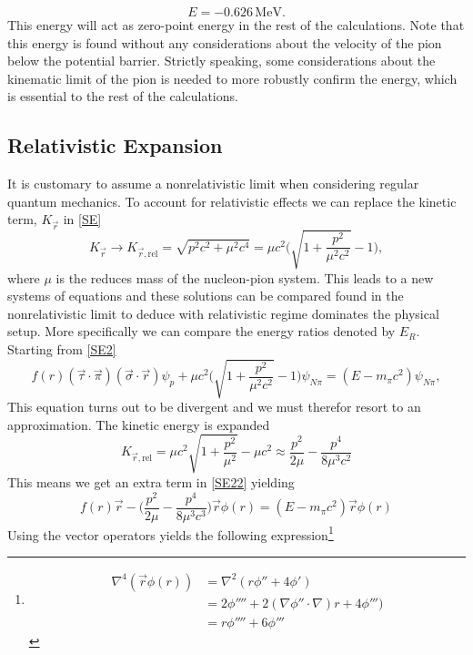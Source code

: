 \begin{equation}
E = -0.626 \, \text{MeV}.
\end{equation}
This energy will act as zero-point energy in the rest of the calculations. Note that this energy is found without any considerations about the velocity of the pion below the potential barrier. Strictly speaking, some considerations about the kinematic limit of the pion is needed to more robustly confirm the energy, which is essential to the rest of the calculations.
\subsection{Relativistic Expansion}
 It is customary to assume a nonrelativistic limit when considering regular quantum mechanics. To account for relativistic effects we can replace the kinetic term, $K_{\vec{r}}$ in \eqref{SE}
 \begin{equation}
     K_{\vec{r}}\rightarrow K_{\vec{r},\text{rel}} = \sqrt{p^2 c^2+\mu^2 c^4} = \mu c^2 \bigg(\sqrt{1+\frac{p^2}{\mu^2 c^2}}-1 \bigg),
 \end{equation}
 where $\mu$ is the reduces mass of the nucleon-pion system. This leads to a new systems of equations and these solutions can be compared found in the nonrelativistic limit to deduce with relativistic regime dominates the physical setup. More specifically we can compare the energy ratios denoted by $E_R$. Starting from \eqref{SE2}
 \begin{equation}
     f(r) (\vec{\tau} \cdot \vec{\pi})(\vec{\sigma}\cdot \vec{r})\psi_p + \mu c^2 \bigg(\sqrt{1+\frac{p^2}{\mu^2 c^2}}-1 \bigg)\psi_{N\pi} = (E-m_{\pi}c^2)\psi_{N\pi},
 \end{equation}
 This equation turns out to be divergent and we must therefor resort to an approximation. The kinetic energy is expanded
 \begin{equation}
     K_{\vec{r},\text{rel}} = \mu c^2\sqrt{1+\frac{p^2}{\mu^2}}-\mu c^2 \approx \frac{p^2}{2\mu}-\frac{p^4}{8\mu^3 c^2}
 \end{equation}
 This means we get an extra term in \eqref{SE22} yielding
 \begin{equation}
     f(r)\vec{r}-\bigg( \frac{p^2}{2\mu}-\frac{p^4}{8\mu^3 c^3} \bigg)\vec{r}\phi(r) = (E-m_\pi c^2)\vec{r}\phi(r)
 \end{equation}
 Using the vector operators yields the following expression\footnote{\begin{align*}
     \nabla^4(\vec{r}\phi(r))&=\nabla^2(r\phi''+4\phi') \\
     &= 2\phi''''+2(\nabla\phi''\cdot\nabla)r+4\phi''') \\
     &=r\phi''''+6\phi'''
 \end{align*}}
